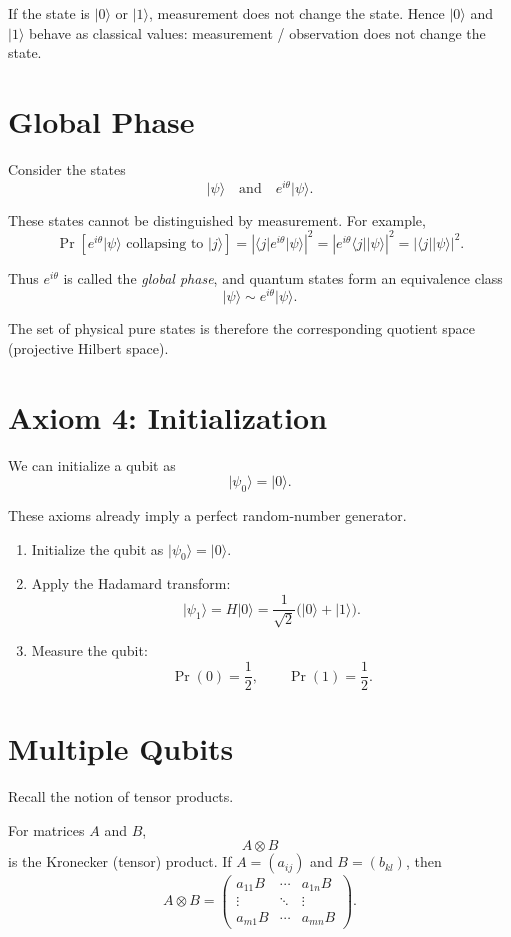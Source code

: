 \documentclass[11pt]{article}
\newcommand{\ket}[1]{\lvert #1\rangle}
\newcommand{\bra}[1]{\langle #1\rvert}
\newcommand{\Prob}{\operatorname{Pr}}
\begin{document}
If the state is $\ket{0}$ or $\ket{1}$, measurement does not change the state.
Hence $\ket{0}$ and $\ket{1}$ behave as classical values: measurement /
observation does not change the state.

\section{Global Phase}

Consider the states
\[
  \ket{\psi}
  \quad\text{and}\quad
  e^{i\theta}\ket{\psi}.
\]

These states cannot be distinguished by measurement. For example,
\[
  \Prob\!\left[
    e^{i\theta}\ket{\psi}\text{ collapsing to }\ket{j}
  \right]
  =
  \left|\bra{j}e^{i\theta}\ket{\psi}\right|^2
  =
  \left|e^{i\theta}\bra{j}\ket{\psi}\right|^2
  =
  |\bra{j}\ket{\psi}|^2.
\]

Thus $e^{i\theta}$ is called the \emph{global phase}, and quantum states
form an equivalence class
\[
  \ket{\psi}\sim e^{i\theta}\ket{\psi}.
\]

The set of physical pure states is therefore the corresponding quotient
space (projective Hilbert space).

\section{Axiom 4: Initialization}

We can initialize a qubit as
\[
  \ket{\psi_0}=\ket{0}.
\]

These axioms already imply a perfect random-number generator.

\begin{enumerate}
  \item Initialize the qubit as $\ket{\psi_0}=\ket{0}$.
  \item Apply the Hadamard transform:
  \[
    \ket{\psi_1}
    =
    H\ket{0}
    =
    \frac{1}{\sqrt2}\bigl(\ket{0}+\ket{1}\bigr).
  \]
  \item Measure the qubit:
  \[
    \Prob(0)=\frac12,
    \qquad
    \Prob(1)=\frac12.
  \]
\end{enumerate}

\section{Multiple Qubits}

Recall the notion of tensor products.

For matrices $A$ and $B$,
\[
  A\otimes B
\]
is the Kronecker (tensor) product. If
$A=(a_{ij})$ and $B=(b_{kl})$, then
\[
  A\otimes B
  =
  \begin{pmatrix}
    a_{11}B & \cdots & a_{1n}B\\
    \vdots  & \ddots & \vdots\\
    a_{m1}B & \cdots & a_{mn}B
  \end{pmatrix}.
\]
\end{document}

